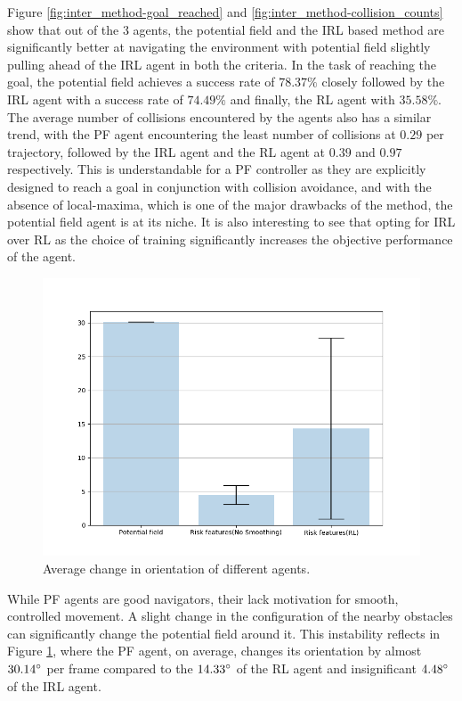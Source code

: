 Figure \ref{fig:inter_method-goal_reached} and \ref{fig:inter_method-collision_counts} show that out of the 3 agents, the potential field and the IRL based method are significantly better at navigating the environment with potential field slightly pulling ahead of the IRL agent in both the criteria. In the task of reaching the goal, the potential field achieves a success rate of $78.37\%$ closely followed by the IRL agent with a success rate of  $74.49\%$ and finally, the RL agent with $35.58\%$. The average number of collisions encountered by the agents also has a similar trend, with the PF agent encountering the least number of collisions at $0.29$ per trajectory, followed by the IRL agent and the RL agent at $0.39$ and $0.97$ respectively. This is understandable for a PF controller as they are explicitly designed to reach a goal in conjunction with collision avoidance, and with the absence of local-maxima, which is one of the major drawbacks of the method, the potential field agent is at its niche. It is also interesting to see that opting for IRL over RL as the choice of training significantly increases the objective performance of the agent.


\begin{figure}[htbp]
    \centering
    \includegraphics[width=0.7\linewidth]{plots/inter_method/trajectory_smoothness.png}
    \caption{Average change in orientation of different agents.}
    \label{fig:inter_method-change_in_orientation_avg}
\end{figure}
While PF agents are good navigators, their lack motivation for smooth, controlled movement. A slight change in the configuration of the nearby obstacles can significantly change the potential field around it. This instability reflects in Figure \ref{fig:inter_method-change_in_orientation_avg}, where the PF agent, on average, changes its orientation by almost $30.14\degree$ per frame compared to the $14.33\degree$ of the RL agent and insignificant $4.48\degree$ of the IRL agent.

